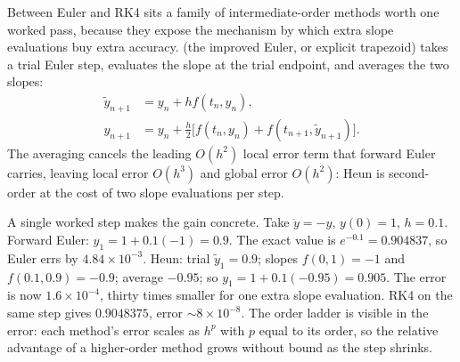 Between Euler and RK4 sits a family of intermediate-order methods
worth one worked pass, because they expose the mechanism by which
extra slope evaluations buy extra accuracy. 
(the improved Euler, or explicit trapezoid) takes a trial Euler step,
evaluates the slope at the trial endpoint, and averages the two
slopes:
\[
\begin{aligned}
\tilde{y}_{n+1} &= y_{n} + h f(t_{n}, y_{n}), \\
y_{n+1} &= y_{n} + \frac{h}{2}\bigl[f(t_{n}, y_{n}) + f(t_{n+1},
\tilde{y}_{n+1})\bigr].
\end{aligned}
\]
The averaging cancels the leading $O(h^{2})$ local error term that
forward Euler carries, leaving local error $O(h^{3})$ and global
error $O(h^{2})$: Heun is second-order at the cost of two slope
evaluations per step.

A single worked step makes the gain concrete. Take $\dot{y} = -y$,
$y(0) = 1$, $h = 0.1$. Forward Euler: $y_{1} = 1 + 0.1(-1) = 0.9$.
The exact value is $e^{-0.1} = 0.904837$, so Euler errs by
$4.84 \times 10^{-3}$. Heun: trial $\tilde{y}_{1} = 0.9$; slopes
$f(0, 1) = -1$ and $f(0.1, 0.9) = -0.9$; average $-0.95$; so
$y_{1} = 1 + 0.1(-0.95) = 0.905$. The error is now $1.6 \times
10^{-4}$, thirty times smaller for one extra slope evaluation. RK4
on the same step gives $0.9048375$, error $\sim 8 \times 10^{-8}$.
The order ladder is visible in the error: each method's error scales
as $h^{p}$ with $p$ equal to its order, so the relative advantage of
a higher-order method grows without bound as the step shrinks.



